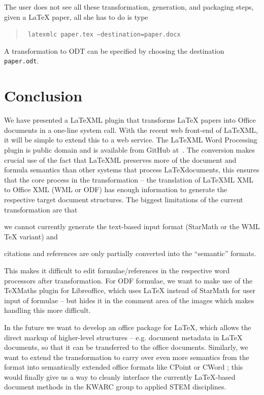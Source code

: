 \documentclass{llncs}
\def\latexml{{\LaTeX}ML\xspace}
\begin{document}
The user does not see all these transformation, generation, and packaging steps, given a
{\LaTeX} paper, all she has to do is type 
\begin{quote}\tt
latexmlc paper.tex --destination=paper.docx
\end{quote}
A transformation to ODT can be specified by choosing the destination \texttt{paper.odt}.

\section{Conclusion}\label{sec:concl}
We have presented a \latexml plugin that transforms {\LaTeX} papers into Office documents
in a one-line system call. With the recent web front-end of \latexml, it will be simple to
extend this to a web service. The \latexml Word Processing plugin is public domain and is
available from GitHub at~\cite{LaTeX2Office:github:on}. The conversion makes crucial use
of the fact that \latexml preserves more of the document and formula semantics than other
systems that process \LaTeX documents, this ensures that the core process in the
transformation -- the translation of \latexml XML to Office XML (WML or ODF) has enough
information to generate the respective target document structures. The biggest limitations
of the current transformation are that
\begin{inparaenum}[\em i\rm)]
\item we cannot currently generate the text-based input format (StarMath or the WML {\TeX}
  variant) and 
\item citations and references are only partially converted into the ``semantic'' formats.
\end{inparaenum}
This makes it difficult to edit formulae/references in the respective word processors
after transformation. For ODF formulae, we want to make use of the TeXMaths plugin for
Libreoffice, which uses {\LaTeX} instead of StarMath for user input of formulae -- but
hides it in the comment area of the images which makes handling this more difficult.

In the future we want to develop an office package for \LaTeX, which allows the direct
markup of higher-level structures -- e.g. document metadata in {\LaTeX} documents, so that
it can be transferred to the office documents. Similarly, we want to extend the
transformation to carry over even more semantics from the \stex format into semantically
extended office formats like CPoint or
CWord
; this would finally give us a
way to cleanly interface the currently {\LaTeX}-based document methods in the KWARC group
to applied STEM disciplines.

\printbibliography
\end{document}
